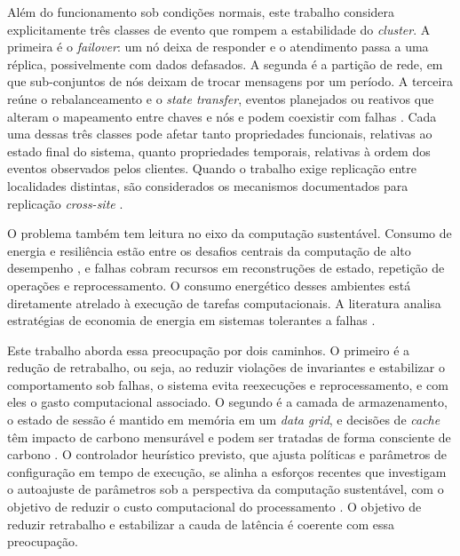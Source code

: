 Além do funcionamento sob condições normais, este trabalho considera explicitamente três classes de evento que rompem a estabilidade do \emph{cluster}. A primeira é o \emph{failover}: um nó deixa de responder e o atendimento passa a uma réplica, possivelmente com dados defasados. A segunda é a partição de rede, em que sub-conjuntos de nós deixam de trocar mensagens por um período. A terceira reúne o rebalanceamento e o \emph{state transfer}, eventos planejados ou reativos que alteram o mapeamento entre chaves e nós e podem coexistir com falhas \citep{infinispan_docs_stable}. Cada uma dessas três classes pode afetar tanto propriedades funcionais, relativas ao estado final do sistema, quanto propriedades temporais, relativas à ordem dos eventos observados pelos clientes.  Quando o trabalho exige replicação entre localidades distintas, são considerados os mecanismos documentados para replicação \emph{cross-site} \citep{infinispan_xsite}. 

O problema também tem leitura no eixo da computação sustentável. Consumo de energia e resiliência estão entre os desafios centrais da computação de alto desempenho \citep{navaux_hpc_challenges_2023}, e falhas cobram recursos em reconstruções de estado, repetição de operações e reprocessamento. O consumo energético desses ambientes está diretamente atrelado à execução de tarefas computacionais. A literatura analisa estratégias de economia de energia em sistemas tolerantes a falhas \citep{ft_hpc_energy_2024}.

Este trabalho aborda essa preocupação por dois caminhos. O primeiro é a redução de retrabalho, ou seja, ao reduzir violações de invariantes e estabilizar o comportamento sob falhas, o sistema evita reexecuções e reprocessamento, e com eles o gasto computacional associado. O segundo é a camada de armazenamento, o estado de sessão é mantido em memória em um \emph{data grid}, e decisões de \emph{cache} têm impacto de carbono mensurável e podem ser tratadas de forma consciente de carbono \citep{tian_greencache_2026}. O controlador heurístico previsto, que ajusta políticas e parâmetros de configuração em tempo de execução, se alinha a esforços recentes que investigam o autoajuste de parâmetros sob a perspectiva da computação sustentável, com o objetivo de reduzir o custo computacional do processamento \citep{lemos_eradrs_2025}. O objetivo de reduzir retrabalho e estabilizar a cauda de latência é coerente com essa preocupação.

